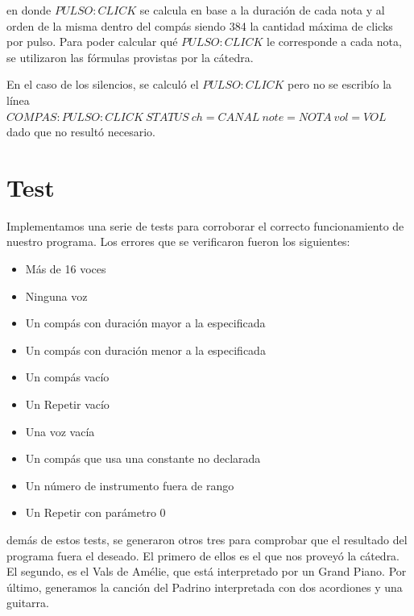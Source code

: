 \documentclass[a4paper, 10pt, twoside]{article}
\begin{document}
en donde $PULSO:CLICK$ se calcula en base a la duración de cada nota y al orden de la misma dentro del compás siendo 384 la cantidad máxima de clicks por pulso. Para poder calcular qué $PULSO:CLICK$ le corresponde a cada nota, se utilizaron las fórmulas provistas por la cátedra.

En el caso de los silencios, se calculó el $PULSO:CLICK$ pero no se escribío la línea $COMPAS:PULSO:CLICK\ STATUS\ ch=CANAL\ note=NOTA\ vol=VOL$ dado que no resultó necesario.

\newpage


\section{Test}
Implementamos una serie de tests para corroborar el correcto funcionamiento de nuestro programa. Los errores que se verificaron fueron los siguientes:

\begin{itemize}
\item Más de 16 voces
\item Ninguna voz
\item Un compás con duración mayor a la especificada
\item Un compás con duración menor a la especificada
\item Un compás vacío 
\item Un Repetir vacío
\item Una voz vacía 
\item Un compás que usa una constante no declarada
\item Un número de instrumento fuera de rango
\item Un Repetir con parámetro 0

\end{itemize}
demás de estos tests, se generaron otros tres para comprobar que el resultado del programa fuera el deseado. El primero de ellos es el que nos proveyó la cátedra. El segundo, es el Vals de Amélie, que está interpretado por un Grand Piano. Por último, generamos la canción del Padrino interpretada con dos acordiones y una guitarra.


\end{document}
